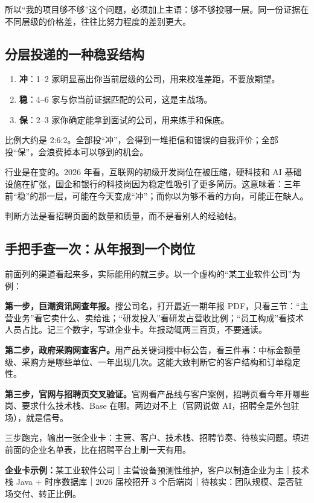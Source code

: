 \documentclass[UTF8,zihao=5,openany]{ctexbook}
\begin{document}
所以“我的项目够不够”这个问题，必须加上主语：够不够投哪一层。同一份证据在不同层级的价格差，往往比努力程度的差别更大。

\subsection{分层投递的一种稳妥结构}
\begin{enumerate}
\item \textbf{冲}：1--2 家明显高出你当前层级的公司，用来校准差距，不要放期望。
\item \textbf{稳}：4--6 家与你当前证据匹配的公司，这是主战场。
\item \textbf{保}：2--3 家你确定能拿到面试的公司，用来练手和保底。
\end{enumerate}

比例大约是 2:6:2。全部投“冲”，会得到一堆拒信和错误的自我评价；全部投“保”，会浪费掉本可以够到的机会。

行业是在变的。2026 年看，互联网的初级开发岗位在被压缩，硬科技和 AI 基础设施在扩张，国企和银行的科技岗因为稳定性吸引了更多简历。这意味着：三年前“稳”的那一层，可能在今天变成“冲”；而你以为够不着的方向，可能正在缺人。

判断方法是看招聘页面的数量和质量，而不是看别人的经验帖。


\subsection{手把手查一次：从年报到一个岗位}

前面列的渠道看起来多，实际能用的就三步。以一个虚构的“某工业软件公司”为例：

\textbf{第一步，巨潮资讯网查年报。}搜公司名，打开最近一期年报 PDF，只看三节：“主营业务”看它卖什么、卖给谁；“研发投入”看研发占营收比例；“员工构成”看技术人员占比。记三个数字，写进企业卡。年报动辄两三百页，不要通读。

\textbf{第二步，政府采购网查客户。}用产品关键词搜中标公告，看三件事：中标金额量级、采购方是哪些单位、一年出现几次。这能大致判断它的客户结构和订单稳定性。

\textbf{第三步，官网与招聘页交叉验证。}官网看产品线与客户案例，招聘页看今年开哪些岗、要求什么技术栈、Base 在哪。两边对不上（官网说做 AI，招聘全是外包驻场），就是信号。

三步跑完，输出一张企业卡：主营、客户、技术栈、招聘节奏、待核实问题。填进前面的企业名单表，比在招聘平台上刷一天有用。

\begin{casebox}
\textbf{企业卡示例：}某工业软件公司｜主营设备预测性维护，客户以制造企业为主｜技术栈 Java + 时序数据库｜2026 届校招开 3 个后端岗｜待核实：团队规模、是否驻场交付、转正比例。
\end{casebox}
\end{document}
